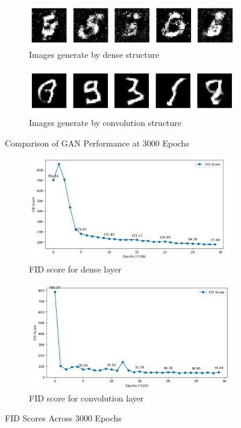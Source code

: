 \begin{figure}[H]
    \centering
    \begin{subfigure}[b]{\linewidth}
        \centering
        \includegraphics[width=0.7\linewidth]{./Images/generate_image_by_dense_layer.jpg}
        \caption{Images generate by dense structure}
        \label{fig:Dense}
    \end{subfigure}
    \vspace{0.05\linewidth} 
    \begin{subfigure}[b]{\linewidth}
        \centering
        \includegraphics[width=0.7\linewidth]{./Images/generate_image_by_Convolution_layer.jpg}
        \caption{Images generate by convolution structure}
        \label{fig:Conv2DTranspose}
    \end{subfigure}
    \caption{Comparison of GAN Performance at 3000 Epochs}
    \label{fig:combined}
\end{figure}

\begin{figure}[H]
    \centering
    \begin{subfigure}[b]{\linewidth}
        \centering
        \includegraphics[width=0.7\linewidth]{./Images/fid_score_for_dense_layer.jpg}
        \caption{FID score for dense layer}
        \label{fig:Dense}
    \end{subfigure}
    \vspace{0.05\linewidth} 
    \begin{subfigure}[b]{\linewidth}
        \centering
        \includegraphics[width=0.7\linewidth]{./Images/fid_score_for_convolution_layer.jpg}
        \caption{FID score for convolution layer}
        \label{fig:Conv2DTranspose}
    \end{subfigure}
    \caption{FID Scores Across 3000 Epochs}
    \label{fig:combined}
\end{figure}


